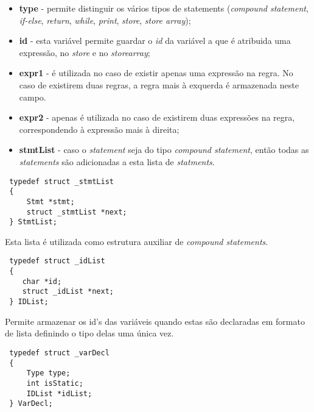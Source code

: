 \documentclass[11pt,a4paper]{article}
\begin{document}
\vspace{0.3cm}

\begin{itemize}
    \item \textbf{type} - permite distinguir os vários tipos de statements (\textit{compound statement}, \textit{if-else}, \textit{return}, \textit{while}, \textit{print}, \textit{store}, \textit{store array});
    
    \item \textbf{id} - esta variável permite guardar o \emph{id} da variável a que é atribuida uma expressão, no \emph{store} e no \emph{storearray};
    
    \item \textbf{expr1} - é utilizada no caso de existir apenas uma expressão na regra. No caso de existirem duas regras, a regra mais à exquerda é armazenada neste campo.
    
    \item \textbf{expr2} - apenas é utilizada no caso de existirem duas expressões na regra, correspondendo à expressão mais à direita;
    
    \item \textbf{stmtList} - caso o \emph{statement} seja do tipo \emph{compound statement}, então todas as \emph{statements} são adicionadas a esta lista de \emph{statments}.
\end{itemize}

\begin{lstlisting}
 typedef struct _stmtList
 {
     Stmt *stmt;
     struct _stmtList *next;
 } StmtList;
\end{lstlisting}

\vspace{0.3cm}

Esta lista é utilizada como estrutura auxiliar de \textit{compound statements}.

\begin{lstlisting}
 typedef struct _idList
 {
 	char *id;
 	struct _idList *next;
 } IDList;
\end{lstlisting}

\vspace{0.3cm}

Permite armazenar os id's das variáveis quando estas são declaradas em formato de lista definindo o tipo delas uma única vez.

\begin{lstlisting}
 typedef struct _varDecl
 {
     Type type;
	 int isStatic;
	 IDList *idList;
 } VarDecl;
\end{lstlisting}
\end{document}
